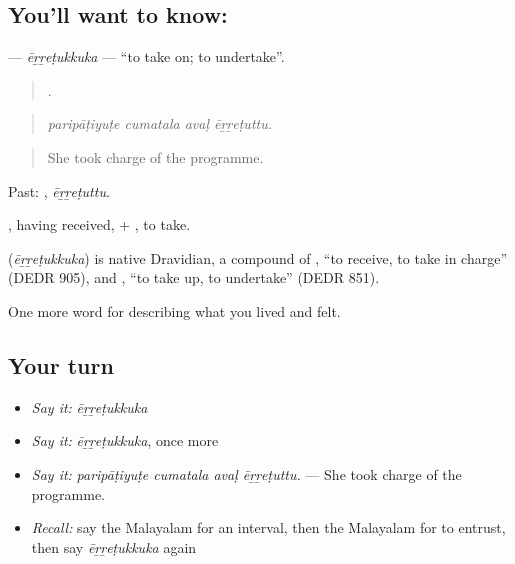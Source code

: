 \subsection*{You'll want to know: }
\textbf{} — \emph{ēṟṟeṭukkuka} — \textquotedblleft{}to take on; to undertake\textquotedblright{}.

\begin{quote}
   .
\end{quote}

\begin{quote}
\emph{paripāṭiyuṭe cumatala avaḷ ēṟṟeṭuttu.}
\end{quote}

\begin{quote}
She took charge of the programme.
\end{quote}

Past: , \emph{ēṟṟeṭuttu}.

, having received, + , to take.

\begin{cousinweb}
\textbf{} (\emph{ēṟṟeṭukkuka}) is native Dravidian, a compound of , \textquotedblleft{}to receive, to take in charge\textquotedblright{} (DEDR 905), and , \textquotedblleft{}to take up, to undertake\textquotedblright{} (DEDR 851).
\end{cousinweb}

\begin{grammarlens}[title={What you've built}]
One more word for describing what you lived and felt.
\end{grammarlens}

\subsection*{Your turn}
\begin{itemize}
\raggedright
  \item \emph{Say it:} \emph{ēṟṟeṭukkuka}
  \item \emph{Say it:} \emph{ēṟṟeṭukkuka}, once more
  \item \emph{Say it:} \emph{paripāṭiyuṭe cumatala avaḷ ēṟṟeṭuttu.} — She took charge of the programme.
  \item \emph{Recall:} say the Malayalam for an interval, then the Malayalam for to entrust, then say \emph{ēṟṟeṭukkuka} again
\end{itemize}

